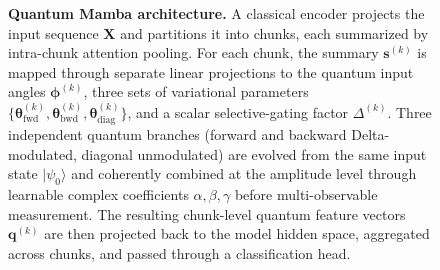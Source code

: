\begin{figure}[t]
\caption{%
\textbf{Quantum Mamba architecture.}
A classical encoder projects the input sequence $\mathbf{X}$ and partitions it into chunks, each summarized by intra-chunk attention pooling.
For each chunk, the summary $\mathbf{s}^{(k)}$ is mapped through separate linear projections to the quantum input angles $\boldsymbol{\phi}^{(k)}$, three sets of variational parameters $\{\boldsymbol{\theta}_{\text{fwd}}^{(k)}, \boldsymbol{\theta}_{\text{bwd}}^{(k)}, \boldsymbol{\theta}_{\text{diag}}^{(k)}\}$, and a scalar selective-gating factor $\Delta^{(k)}$.
Three independent quantum branches (forward and backward Delta-modulated, diagonal unmodulated) are evolved from the same input state $|\psi_0\rangle$ and coherently combined at the amplitude level through learnable complex coefficients $\alpha, \beta, \gamma$ before multi-observable measurement.
The resulting chunk-level quantum feature vectors $\mathbf{q}^{(k)}$ are then projected back to the model hidden space, aggregated across chunks, and passed through a classification head.%
}
\label{fig:qmamba_architecture}
\end{figure}
